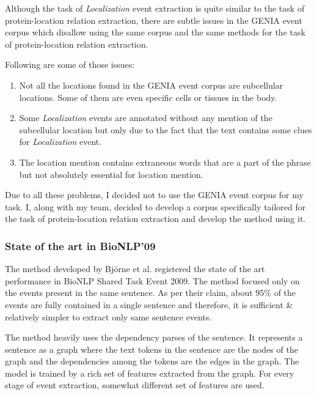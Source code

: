 Although the task of \textit{Localization} event extraction is quite similar to the task of protein-location relation extraction, there are subtle issues in the GENIA event corpus which disallow using the same corpus and the same methods for the task of protein-location relation extraction.

Following are some of those issues:

\begin{enumerate}

\item Not all the locations found in the GENIA event corpus are subcellular locations. Some of them are even specific cells or tissues in the body.

\item Some \textit{Localization} events are annotated without any mention of the subcellular location but only due to the fact that the text contains some clues for \textit{Localization} event.

\item The location mention contains extraneous words that are a part of the phrase but not absolutely essential for location mention.

\end{enumerate}

Due to all these problems, I decided not to use the GENIA event corpus for my task. I, along with my team, decided to develop a corpus specifically tailored for the task of protein-location relation extraction and develop the method using it.

\subsubsection{State of the art in BioNLP'09}

The method developed by Björne et al. \cite{bjorne2009extracting} registered the state of the art performance in BioNLP Shared Task Event 2009. The method focused only on the events present in the same sentence. As per their claim, about 95\% of the events are fully contained in a single sentence and therefore, it is sufficient \& relatively simpler to extract only same sentence events.

The method heavily uses the dependency parses of the sentence. It represents a sentence as a graph where the text tokens in the sentence are the nodes of the graph and the dependencies among the tokens are the edges in the graph. The model is trained by a rich set of features extracted from the graph. For every stage of event extraction, somewhat different set of features are used. 

